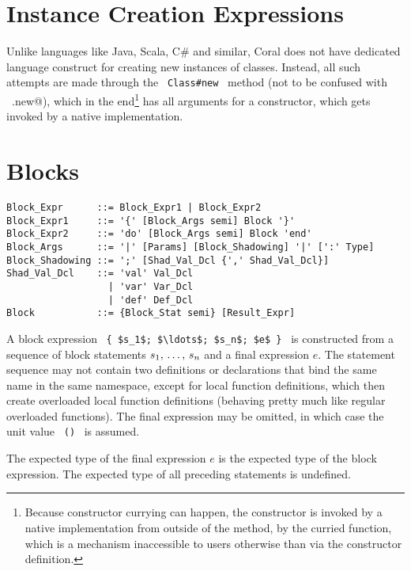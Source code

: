 \section{Instance Creation Expressions}
\label{sec:instance-creation-exprs}

Unlike languages like Java, Scala, C\# and similar, Coral does not have dedicated language construct for creating new instances of classes. Instead, all such attempts are made through the ~\lstinline!Class#new!~ method (not to be confused with ~\lstinline@Class.new@), which in the end\footnote{Because constructor currying can happen, the constructor is invoked by a native implementation from outside of the  method, by the curried function, which is a mechanism inaccessible to users otherwise than via the constructor definition.} has all arguments for a constructor, which gets invoked by a native implementation. 






\section{Blocks}
\label{sec:blocks}

\syntax\begin{lstlisting}
Block_Expr      ::= Block_Expr1 | Block_Expr2
Block_Expr1     ::= '{' [Block_Args semi] Block '}'
Block_Expr2     ::= 'do' [Block_Args semi] Block 'end'
Block_Args      ::= '|' [Params] [Block_Shadowing] '|' [':' Type]
Block_Shadowing ::= ';' [Shad_Val_Dcl {',' Shad_Val_Dcl}]
Shad_Val_Dcl    ::= 'val' Val_Dcl
                  | 'var' Var_Dcl
                  | 'def' Def_Dcl
Block           ::= {Block_Stat semi} [Result_Expr]
\end{lstlisting}

A block expression ~\lstinline!{ $s_1$; $\ldots$; $s_n$; $e$ }!~ is constructed from a sequence of block statements $s_1 ,\, \ldots ,\, s_n$ and a final expression $e$. The statement sequence may not contain two definitions or declarations that bind the same name in the same namespace, except for local function definitions, which then create overloaded local function definitions (behaving pretty much like regular overloaded functions). The final expression may be omitted, in which case the unit value ~\lstinline!()!~ is assumed. 

The expected type of the final expression $e$ is the expected type of the block expression. The expected type of all preceding statements is undefined. 

